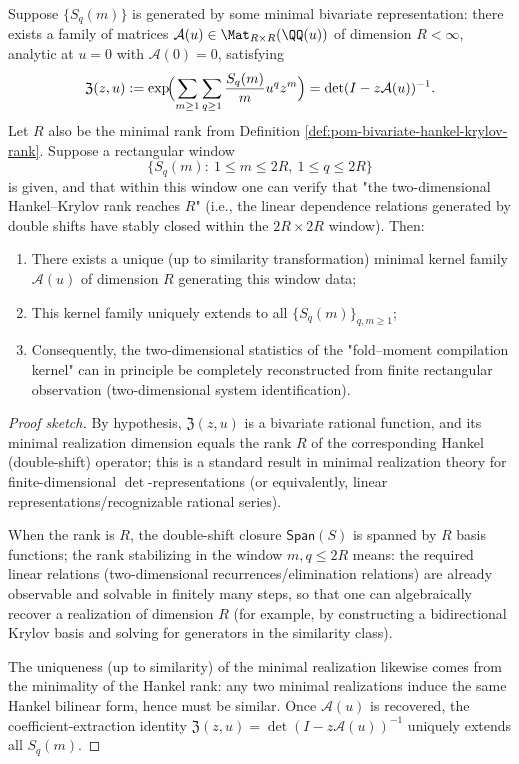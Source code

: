 \begin{theorem}\label{thm:pom-bivariate-system-identification-finite-window}
Suppose \(\{S_q(m)\}\) is generated by some minimal bivariate representation: there exists a family of matrices
\(\mathcal{A}(u)\in\Mat_{R\times R}(\QQ(u))\) of dimension \(R<\infty\), analytic at \(u=0\) with \(\mathcal{A}(0)=0\), satisfying
\[
\mathfrak{Z}(z,u)
:=\exp\!\Bigl(\sum_{m\ge1}\sum_{q\ge1}\frac{S_q(m)}{m}u^q z^m\Bigr)
=\det(I-z\mathcal{A}(u))^{-1}.
\]
Let \(R\) also be the minimal rank from Definition \ref{def:pom-bivariate-hankel-krylov-rank}.
Suppose a rectangular window
\[
\{S_q(m):\ 1\le m\le 2R,\ 1\le q\le 2R\}
\]
is given, and that within this window one can verify that "the two-dimensional Hankel--Krylov rank reaches \(R\)" (i.e., the linear dependence relations generated by double shifts have stably closed within the \(2R\times 2R\) window).
Then:
\begin{enumerate}
  \item There exists a unique (up to similarity transformation) minimal kernel family \(\mathcal{A}(u)\) of dimension \(R\) generating this window data;
  \item This kernel family uniquely extends to all \(\{S_q(m)\}_{q,m\ge1}\);
  \item Consequently, the two-dimensional statistics of the "fold--moment compilation kernel" can in principle be completely reconstructed from finite rectangular observation (two-dimensional system identification).
\end{enumerate}
\end{theorem}
\begin{proof}[Proof sketch]
By hypothesis, \(\mathfrak{Z}(z,u)\) is a bivariate rational function, and its minimal realization dimension equals the rank \(R\) of the corresponding Hankel (double-shift) operator;
this is a standard result in minimal realization theory for finite-dimensional \(\det\)-representations (or equivalently, linear representations/recognizable rational series).
\par
When the rank is \(R\), the double-shift closure \(\mathsf{Span}(S)\) is spanned by \(R\) basis functions;
the rank stabilizing in the window \(m,q\le 2R\) means: the required linear relations (two-dimensional recurrences/elimination relations) are already observable and solvable in finitely many steps,
so that one can algebraically recover a realization of dimension \(R\) (for example, by constructing a bidirectional Krylov basis and solving for generators in the similarity class).
\par
The uniqueness (up to similarity) of the minimal realization likewise comes from the minimality of the Hankel rank: any two minimal realizations induce the same Hankel bilinear form, hence must be similar.
Once \(\mathcal{A}(u)\) is recovered, the coefficient-extraction identity
\(
\mathfrak{Z}(z,u)=\det(I-z\mathcal{A}(u))^{-1}
\)
uniquely extends all \(S_q(m)\).
\end{proof}




